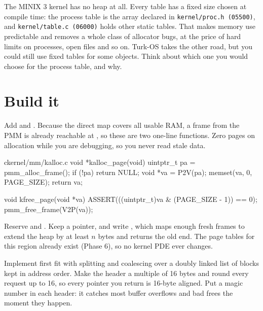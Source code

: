 \documentclass[11pt,a4paper]{article}
\begin{document}
\begin{minixbox}
The MINIX 3 kernel has no heap at all. Every table has a fixed size chosen at compile time: the process table is the
array  declared in \texttt{kernel/proc.h (05500)}, and \texttt{kernel/table.c
(06000)} holds other static tables. That makes memory use predictable and removes a whole class of allocator bugs, at
the price of hard limits on processes, open files and so on. Turk-OS takes the other road, but you could still use
fixed tables for some objects. Think about which one you would choose for the process table, and why.
\end{minixbox}

\section{Build it}

Add  and . Because the direct map covers all usable RAM, a frame from the PMM
is already reachable at , so these are two one-line functions. Zero pages on allocation while you
are debugging, so you never read stale data.

\begin{lst}{c}{kernel/mm/kalloc.c}
void *kalloc_page(void)
{
    uintptr_t pa = pmm_alloc_frame();
    if (!pa)
        return NULL;
    void *va = P2V(pa);
    memset(va, 0, PAGE_SIZE);
    return va;
}

void kfree_page(void *va)
{
    ASSERT(((uintptr_t)va & (PAGE_SIZE - 1)) == 0);
    pmm_free_frame(V2P(va));
}
\end{lst}

Reserve  and . Keep a  pointer, and write
, which maps enough fresh frames to extend the heap by at least $n$ bytes and returns the old end.
The page tables for this region already exist (Phase 6), so no kernel PDE ever changes.

Implement first fit with splitting and coalescing over a doubly linked list of blocks kept in address order. Make the
header a multiple of 16 bytes and round every request up to 16, so every pointer you return is 16-byte aligned. Put a
magic number in each header: it catches most buffer overflows and bad frees the moment they happen.
\end{document}
